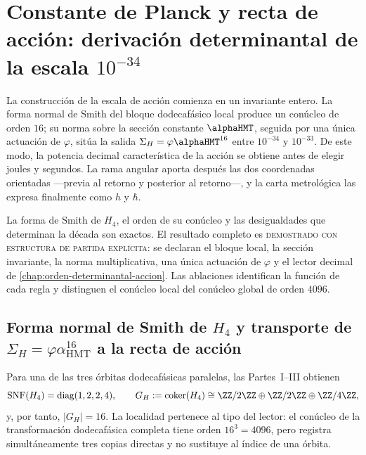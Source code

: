\section{Constante de Planck y recta de acción: derivación determinantal de la escala \texorpdfstring{\(10^{-34}\)}{decádica -34}}
\label{chap:escala-accion}

La construcción de la escala de acción comienza en un invariante entero. La
forma normal de Smith del bloque dodecafásico local produce un conúcleo de
orden \(16\); su norma sobre la sección constante \(\alphaHMT\), seguida por
una única actuación de \(\varphi\), sitúa la salida
\(\Sigma_H=\varphi\alphaHMT^{16}\) entre \(10^{-34}\) y \(10^{-33}\). De
este modo, la potencia decimal característica de la acción se obtiene antes
de elegir joules y segundos. La rama angular aporta después las dos
coordenadas orientadas ---previa al retorno y posterior al retorno---, y la
carta metrológica las expresa finalmente como \(h\) y \(\hbar\).

\begin{exactbox}[title={Resultado rector: del conúcleo local a la escala de acción}]
La forma de Smith de \(H_4\), el orden de su conúcleo y las desigualdades que
determinan la década son exactos. El resultado completo es
\textsc{demostrado con estructura de partida explícita}: se declaran el
bloque local, la sección invariante, la norma multiplicativa, una única
actuación de \(\varphi\) y el lector decimal de
\cref{chap:orden-determinantal-accion}. Las ablaciones identifican la función
de cada regla y distinguen el conúcleo local del conúcleo global de orden
\(4096\).
\end{exactbox}

\subsection{Forma normal de Smith de \texorpdfstring{\(H_4\)}{H4} y transporte de \texorpdfstring{\(\Sigma_H=\varphi\alpha_{\mathrm{HMT}}^{16}\)}{Sigma H} a la recta de acción}

Para una de las tres órbitas dodecafásicas paralelas, las Partes~I--III obtienen
\[
\operatorname{SNF}(H_4)=\operatorname{diag}(1,2,2,4),
\qquad
G_H:=\operatorname{coker}(H_4)
\cong\ZZ/2\ZZ\oplus\ZZ/2\ZZ\oplus\ZZ/4\ZZ,
\]
y, por tanto, \(|G_H|=16\). La localidad pertenece al tipo del lector: el
conúcleo de la transformación dodecafásica completa tiene orden
\(16^3=4096\), pero registra simultáneamente tres copias directas y no
sustituye al índice de una órbita.

